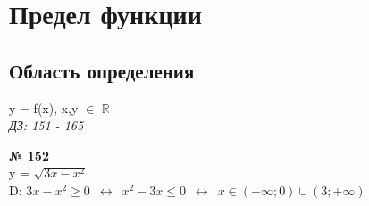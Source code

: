 \documentclass[12pt]{article}
\begin{document}
\vspace{2cm}

\section{Предел функции}
\subsection{Область определения}
y = f(x), x,y $\in$ $\mathbb{R}$\\ 
{\small \textit{ДЗ: 151 - 165}\\}
\vspace{.5cm}

{
	{\textbf{№ 152}\\ \vspace{.2cm}}
	y = $\sqrt{3x-x^2}$\\
	D: $3x-x^2 \geq 0 \enspace \leftrightarrow \enspace x^2-3x \leq 0 \enspace \leftrightarrow \enspace x \in (-\infty; 0)\cup(3; +\infty)$\\
}
\end{document}
